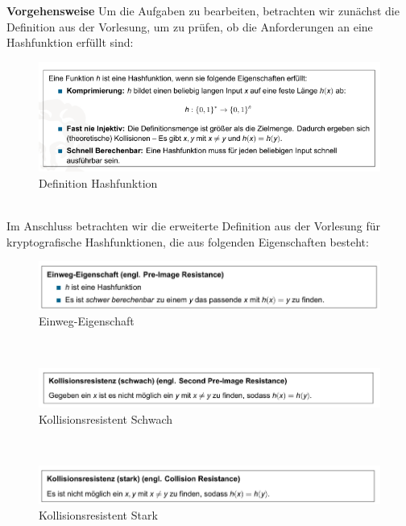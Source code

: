 \documentclass[german]{../uebung}
\begin{document}
\begin{exercise}{1}
	\textbf{Vorgehensweise}
	Um die Aufgaben zu bearbeiten, betrachten wir zunächst die Definition aus der Vorlesung, um zu prüfen, ob die Anforderungen an eine Hashfunktion erfüllt sind:\\
	\begin{figure}[h]
		\centering
		\includegraphics*[scale=.5]{Definition Hashfunktion.png}
		\caption{Definition Hashfunktion}
	\end{figure}\\
	Im Anschluss betrachten wir die erweiterte Definition aus der Vorlesung für kryptografische Hashfunktionen, die aus folgenden Eigenschaften besteht:\\
	\begin{figure}[h]
		\centering
		\includegraphics*[scale=.5]{EinwegEigenschaft.png}
		\caption{Einweg-Eigenschaft}
	\end{figure}\\
	\begin{figure}[h]
		\centering
		\includegraphics*[scale=.5]{Kollisionsresistent.png}
		\caption{Kollisionsresistent Schwach}
	\end{figure}\\
	\begin{figure}[h]
		\centering
		\includegraphics*[scale=.5]{KollisionsresistentStark.png}
		\caption{Kollisionsresistent Stark}
	\end{figure}\\

\end{exercise}
\end{document}
